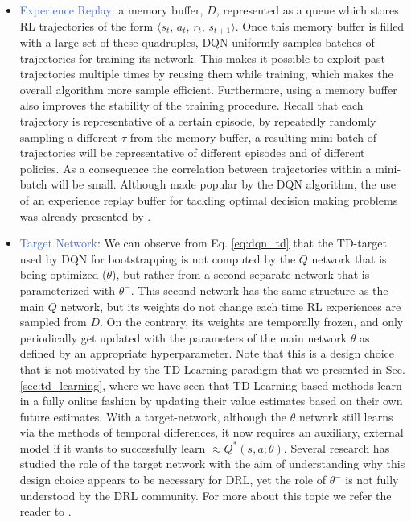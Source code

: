 \begin{itemize}
	\item \textcolor{RoyalBlue}{Experience Replay}: a memory buffer, $D$, represented as a queue which stores RL trajectories of the form $\langle s_{t}$, $a_{t}$, $r_{t}$, $s_{t+1} \rangle$. Once this memory buffer is filled with a large set of these quadruples, DQN uniformly samples batches of trajectories for training its network. This makes it possible to exploit past trajectories multiple times by reusing them while training, which makes the overall algorithm more sample efficient. Furthermore, using a memory buffer also improves the stability of the training procedure. Recall that each trajectory is representative of a certain episode, by repeatedly randomly sampling a different $\tau$ from the memory buffer, a resulting mini-batch of trajectories will be representative of different episodes and of different policies. As a consequence the correlation between trajectories within a mini-batch will be small. Although made popular by the DQN algorithm, the use of an experience replay buffer for tackling optimal decision making problems was already presented by \citet{lin1992self}.
		
	\item \textcolor{RoyalBlue}{Target Network}: We can observe from Eq. \ref{eq:dqn_td} that the TD-target used by DQN for bootstrapping is not computed by the $Q$ network that is being optimized ($\theta$), but rather from a second separate network that is parameterized with $\theta^{-}$. This second network has the same structure as the main $Q$ network, but its weights do not change each time RL experiences are sampled from $D$. On the contrary, its weights are temporally frozen, and only periodically get updated with the parameters of the main network $\theta$ as defined by an appropriate hyperparameter. Note that this is a design choice that is not motivated by the TD-Learning paradigm that we presented in Sec. \ref{sec:td_learning}, where we have seen that TD-Learning based methods learn in a fully online fashion by updating their value estimates based on their own future estimates. With a target-network, although the $\theta$ network still learns via the methods of temporal differences, it now requires an auxiliary, external model if it wants to successfully learn $\approx Q^{*}(s,a;\theta)$. Several research has studied the role of the target network with the aim of understanding why this design choice appears to be necessary for DRL, yet the role of $\theta^{-}$ is not fully understood by the DRL community. For more about this topic we refer the reader to .

\end{itemize}

